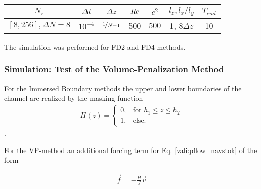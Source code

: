 \begin{center}
\vspace*{0.7ex}
\begin{tabular}{c|c|c|c|c|c|c }
 $ N_z  $                   & $\Delta t$ & $\Delta z$            & $\mbox{\textit{Re}}$  & $c^2$   & $l_z, l_x/l_y$ & $T_{end}$\\
\hline
 $[8, 256], \Delta N = 8 $& $10^{-4}$ & $\nicefrac{1}{N - 1}$ & 500     & $500$   &  1, 8$\Delta z$ &  10\\
\end{tabular}
\vspace*{0.7ex}
\end{center}

The simulation was performed for FD2 and FD4 methods.

\subsubsection{Simulation: Test of the Volume-Penalization Method}


For the Immersed Boundary methods the upper and lower boundaries of the channel are realized by the masking function
\begin{align}
H(z) = \begin{cases}
                    0, & \text{for \  }  h_1 \leq z \leq h_2 \\
                    1, & \text{else}.
             \end{cases}
\end{align}.

For the VP-method an additional forcing term for Eq. \ref{vali:pflow_navstok} of the form

\begin{align}
    \vec{f} = -\frac{H}{J}\vec{v}
\end{align}

